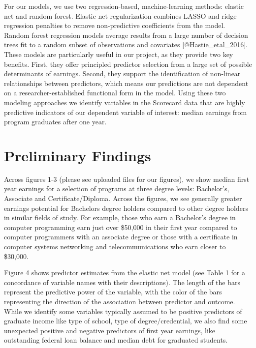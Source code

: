 For our models, we use two regression-based, machine-learning methods:
elastic net and random forest. Elastic net regularization combines LASSO
and ridge regression penalties to remove non-predictive coefficients
from the model. Random forest regression models average results from a
large number of decision trees fit to a random subset of observations
and covariates {[}@Hastie\_etal\_2016{]}. These models are particularly
useful in our project, as they provide two key benefits. First, they
offer principled predictor selection from a large set of possible
determinants of earnings. Second, they support the identification of
non-linear relationships between predictors, which means our predictions
are not dependent on a researcher-established functional form in the
model. Using these two modeling approaches we identify variables in the
Scorecard data that are highly predictive indicators of our dependent
variable of interest: median earnings from program graduates after one
year.

\hypertarget{preliminary-findings}{%
\section{Preliminary Findings}\label{preliminary-findings}}

Across figures 1-3 (please see uploaded files for our figures), we show
median first year earnings for a selection of programs at three degree
levels: Bachelor's, Associate and Certificate/Diploma. Across the
figures, we see generally greater earnings potential for Bachelors
degree holders compared to other degree holders in similar fields of
study. For example, those who earn a Bachelor's degree in computer
programming earn just over \$50,000 in their first year compared to
computer programmers with an associate degree or those with a
certificate in computer systems networking and telecommunications who
earn closer to \$30,000.

Figure 4 shows predictor estimates from the elastic net model (see Table
1 for a concordance of variable names with their descriptions). The
length of the bars represent the predictive power of the variable, with
the color of the bars representing the direction of the association
between predictor and outcome. While we identify some variables
typically assumed to be positive predictors of graduate income like type
of school, type of degree/credential, we also find some unexpected
positive and negative predictors of first year earnings, like
outstanding federal loan balance and median debt for graduated students.

